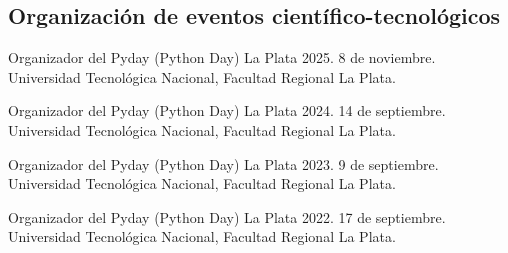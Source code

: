 \documentclass[margin,line]{res}
\begin{document}
\begin{resume}
\subsection{ Organización de eventos científico-tecnológicos}

Organizador del Pyday (Python Day) La Plata 2025. 8 de noviembre. Universidad Tecnológica Nacional, Facultad
Regional La Plata.

Organizador del Pyday (Python Day) La Plata 2024. 14 de septiembre. Universidad Tecnológica Nacional, Facultad
Regional La Plata.

Organizador del Pyday (Python Day) La Plata 2023. 9 de septiembre. Universidad Tecnológica Nacional, Facultad
Regional La Plata.

Organizador del Pyday (Python Day) La Plata 2022. 17 de septiembre. Universidad Tecnológica Nacional, Facultad
Regional La Plata.

% 
% 
% 
% 
% 
% 
% 
% 

\end{resume}
\end{document}
